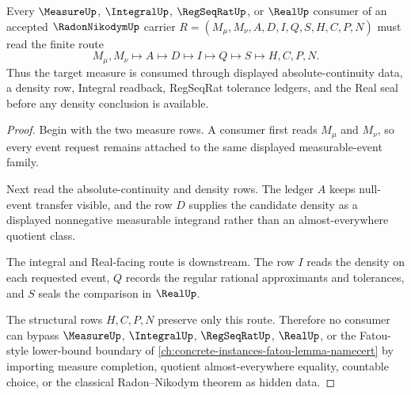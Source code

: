 \begin{theorem}
\label{thm:radon-nikodym-density-route}
Every $\MeasureUp$, $\IntegralUp$, $\RegSeqRatUp$, or $\RealUp$ consumer of an accepted $\RadonNikodymUp$ carrier $R=(M_\mu,M_\nu,A,D,I,Q,S,H,C,P,N)$ must read the finite route
$$
M_\mu,M_\nu \longmapsto A \longmapsto D \longmapsto I \longmapsto Q \longmapsto S \longmapsto H,C,P,N .
$$
Thus the target measure is consumed through displayed absolute-continuity data, a density row, Integral readback, RegSeqRat tolerance ledgers, and the Real seal before any density conclusion is available.
\end{theorem}
\begin{proof}
Begin with the two measure rows. A consumer first reads $M_\mu$ and $M_\nu$, so every event request remains attached to the same displayed measurable-event family.

Next read the absolute-continuity and density rows. The ledger $A$ keeps null-event transfer visible, and the row $D$ supplies the candidate density as a displayed nonnegative measurable integrand rather than an almost-everywhere quotient class.

The integral and Real-facing route is downstream. The row $I$ reads the density on each requested event, $Q$ records the regular rational approximants and tolerances, and $S$ seals the comparison in $\RealUp$.

The structural rows $H,C,P,N$ preserve only this route. Therefore no consumer can bypass $\MeasureUp$, $\IntegralUp$, $\RegSeqRatUp$, $\RealUp$, or the Fatou-style lower-bound boundary of \autoref{ch:concrete-instances-fatou-lemma-namecert} by importing measure completion, quotient almost-everywhere equality, countable choice, or the classical Radon--Nikodym theorem as hidden data.
\end{proof}



